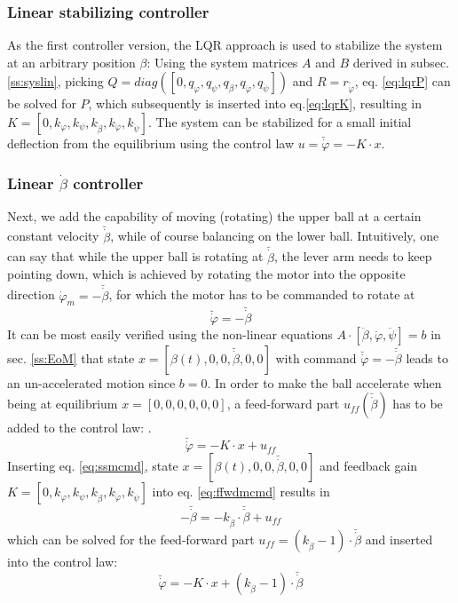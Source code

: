 \documentclass{article}
\begin{document}
\subsubsection{Linear stabilizing controller}
As the first controller version, the LQR approach is used to stabilize the system at an arbitrary position $\beta$:
Using the system matrices $A$ and $B$ derived in subsec. \ref{ss:syslin}, picking $Q = diag \left( \left[0, q_{\varphi}, q_{\psi}, q_{\dot{\beta}}, q_{\dot{\varphi}}, q_{\dot{\psi}} \right] \right)$ and $R = r_{\breve{\dot{\varphi}}}$, eq. \ref{eq:lqrP} can be solved for $P$, which subsequently is inserted into eq.\ref{eq:lqrK}, resulting in $K = \left[0, k_{\varphi}, k_{\psi}, k_{\dot{\beta}}, k_{\dot{\varphi}}, k_{\dot{\psi}} \right]$. The system can be stabilized for a small initial deflection from the equilibrium using the control law $u=\breve{\dot{\varphi}}=-K \cdot x$.

\subsubsection{Linear $\dot{\beta}$ controller}
Next, we add the capability of moving (rotating) the upper ball at a certain constant velocity $\breve{\dot{\beta}}$, while of course balancing on the lower ball.
Intuitively, one can say that while the upper ball is rotating at $\breve{\dot{\beta}}$, the lever arm needs to keep pointing down, which is achieved by rotating the motor into the opposite direction $\dot{\varphi}_m = -\breve{\dot{\beta}}$, for which the motor has to be commanded to rotate at
\begin{equation}
\breve{\dot{\varphi}} = -\breve{\dot{\beta}}
\label{eq:ssmcmd}
\end{equation}
It can be most easily verified using the non-linear equations $A \cdot [\ddot{\beta}, \ddot{\varphi}, \ddot{\psi}] = b$ in sec. \ref{ss:EoM} that state $x = [\beta(t), 0, 0, \breve{\dot{\beta}}, 0, 0]$ with command $\breve{\dot{\varphi}} = -\breve{\dot{\beta}}$ leads to an un-accelerated motion since $b=0$.
In order to make the ball accelerate when being at equilibrium $x=[0,0,0,0,0,0]$, a feed-forward part $u_{ff} \left( \breve{\dot{\beta}} \right)$ has to be added to the control law: .
\begin{equation}
\breve{\dot{\varphi}}=-K \cdot x + u_{ff}
\label{eq:ffwdmcmd}
\end{equation}
Inserting eq. \ref{eq:ssmcmd}, state $x = [\beta(t), 0, 0, \breve{\dot{\beta}}, 0, 0]$ and feedback gain \newline $K = \left[0, k_{\varphi}, k_{\psi}, k_{\dot{\beta}}, k_{\dot{\varphi}}, k_{\dot{\psi}} \right]$ into eq. \ref{eq:ffwdmcmd} results in
\begin{equation}
-\breve{\dot{\beta}} = -k_{\dot{\beta}} \cdot \breve{\dot{\beta}}  + u_{ff}
\end{equation}
which can be solved for the feed-forward part $u_{ff} = (k_{\dot{\beta}} - 1 ) \cdot \breve{\dot{\beta}}$ and inserted into the control law:
\begin{equation}
\breve{\dot{\varphi}}=-K \cdot x + \left(k_{\dot{\beta}} - 1 \right) \cdot \breve{\dot{\beta}}
\end{equation}
\end{document}
